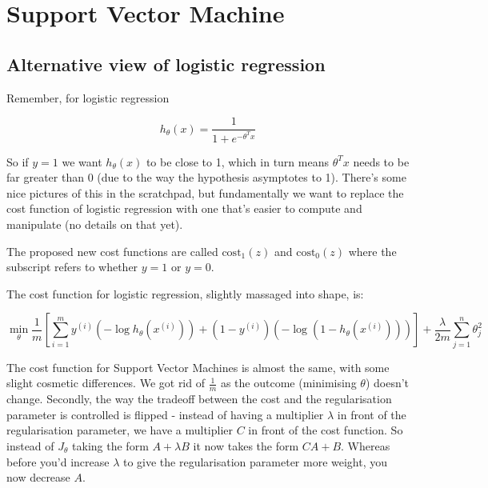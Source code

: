 
\chapter{Support Vector Machine}

\section{Alternative view of logistic regression}

Remember, for logistic regression

\begin{equation}
h_\theta(x) = \frac{1}{1 + e ^{-\theta^Tx}}
\end{equation}

So if $y = 1$ we want $h_\theta(x)$ to be close to 1, which in turn means $\theta^Tx$ needs to be far greater than 0 (due to the way the hypothesis asymptotes to 1). There's some nice pictures of this in the scratchpad, but fundamentally we want to replace the cost function of logistic regression with one that's easier to compute and manipulate (no details on that yet).

The proposed new cost functions are called $\textrm{cost}_1(z)$ and $\textrm{cost}_0(z)$ where the subscript refers to whether $y = 1$ or $y = 0$.

The cost function for logistic regression, slightly massaged into shape, is:

\begin{equation}
\min_\theta \frac{1}{m}
\left[
\sum_{i = 1}^{m}y^{(i)} \left(-\log h_\theta(x^{(i)}) \right) +
(1 - y^{(i)}) \left(-\log(1-h_\theta(x^{(i)})) \right)
\right]
+ \frac{\lambda}{2m}\sum_{j = 1}^{n}\theta_j^2
\end{equation}

The cost function for Support Vector Machines is almost the same, with some slight cosmetic differences. We got rid of $\frac{1}{m}$ as the outcome (minimising $\theta$) doesn't change. Secondly, the way the tradeoff between the cost and the regularisation parameter is controlled is flipped - instead of having a multiplier $\lambda$ in front of the regularisation parameter, we have a multiplier $C$ in front of the cost function. So instead of $J_\theta$ taking the form $A + \lambda B$ it now takes the form $CA + B$. Whereas before you'd increase $\lambda$ to give the regularisation parameter more weight, you now decrease $A$.

